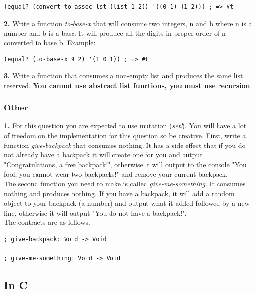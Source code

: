 \documentclass[12pt,extarticle]{article}
\begin{document}
\lstset {
	language=Lisp
}
\begin{lstlisting}
(equal? (convert-to-assoc-lst (list 1 2)) '((0 1) (1 2))) ; => #t
\end{lstlisting}

\noindent
\textbf{2.} Write a function \emph{to-base-x} that will consume two integers, n and b where n is a number and b is a base. It will produce all the digits in proper order of n converted to base b. Example:\\

\lstset {
	language=Lisp
}
\begin{lstlisting}
(equal? (to-base-x 9 2) '(1 0 1)) ; => #t
\end{lstlisting}

\noindent
\textbf{3.} Write a function that consumes a non-empty list and produces the same list reserved. \textbf{You cannot use abstract list functions, you must use recursion}.

\subsubsection{Other}

\textbf{1.} For this question you are expected to use mutation (\emph{set!}). You will have a lot of freedom on the implementation for this question so be creative. First, write a function \emph{give-backpack} that consumes nothing. It has a side effect that if you do not already have a backpack it will create one for you and output "Congratulations, a free backpack!", otherwise it will output to the console "You fool, you cannot wear two backpacks!" and remove your current backpack.\\

The second function you need to make is called \emph{give-me-something}. It consumes nothing and produces nothing. If you have a backpack, it will add a random object to your backpack (a number) and output what it added followed by a new line, otherwise it will output "You do not have a backpack!".\\

The contracts are as follows.\\

\lstset {
	language=Lisp
}
\begin{lstlisting}
; give-backpack: Void -> Void

; give-me-something: Void -> Void
\end{lstlisting}

\subsection{In C}
\end{document}
